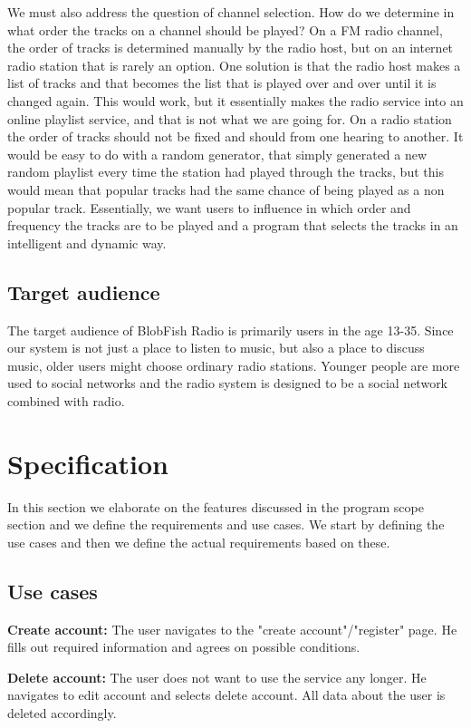 \documentclass[a4paper,11pt,report]{article}
\begin{document}
We must also address the question of channel selection. How do we determine in what order the tracks on a channel should be played? On a FM radio channel, the order of tracks is determined manually by the radio host, but on an internet radio station that is rarely an option. One solution is that the radio host makes a list of tracks and that becomes the list that is played over and over until it is changed again. This would work, but it essentially makes the radio service into an online playlist service, and that is not what we are going for. On a radio station the order of tracks should not be fixed and should from one hearing to another. It would be easy to do with a random generator, that simply generated a new random playlist every time the station had played through the tracks, but this would mean that popular tracks had the same chance of being played as a non popular track. Essentially, we want users to influence in which order and frequency the tracks are to be played and a program that selects the tracks in an intelligent and dynamic way. 

\subsection{Target audience}
The target audience of BlobFish Radio is primarily users in the age 13-35. Since our system is not just a place to listen to music, but also a place to discuss music,  older users might choose ordinary radio stations. Younger people are more used to social networks and the radio system is designed to be a social network combined with radio.

\section{Specification}
In this section we elaborate on the features discussed in the program scope section and we define the requirements and use cases. We start by defining the use cases and then we define the actual requirements based on these. 
\subsection{Use cases}
\textbf{Create account:}
The user navigates to the "create account"/"register" page. He fills out required information and agrees on possible conditions.

\textbf{Delete account:}
The user does not want to use the service any longer. He navigates to edit account and selects delete account. All data about the user is deleted accordingly.
\end{document}
